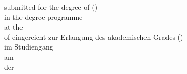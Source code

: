 \clearpage
\thispagestyle{empty}
{\sffamily
  \setlength{\parskip}{0pt}
  \begin{center}
    \vspace*{10mm}
    {\large \IreportAuthor\par}
    \vspace{15mm}
    {\LARGE\bfseries \IreportTitle\par}
    \ifdefempty{\IreportSubtitle}{}{%
      \vspace{4mm}{\large \IreportSubtitle\par}}
  \end{center}

  \vfill

  \noindent
  \begin{minipage}{\textwidth}
    \raggedright
    \ifIEnglish
      \IreportKindName{}
      \ifIIsThesis
        submitted for the degree of \IdegreeName{} (\IdegreeShort)%
      \else
      \fi\\
      in the degree programme \textit{\Icourse}\\
      at the \Ifaculty\\
      of \Iuniversity
    \else
      \IreportKindName{}
      \ifIIsThesis
        eingereicht zur Erlangung des akademischen Grades \IdegreeName{} (\IdegreeShort)%
      \else
      \fi\\
      im Studiengang \textit{\Icourse}\\
      am \Ifaculty\\
      der \Iuniversity
    \fi
    \par\vspace{8mm}
    \Iinfoline{\IfirstSupervisorLabel}{\IfirstSupervisor}%
    \Iinfoline{\IsecondSupervisorLabel}{\IsecondSupervisor}%
  \end{minipage}
}
\clearpage
